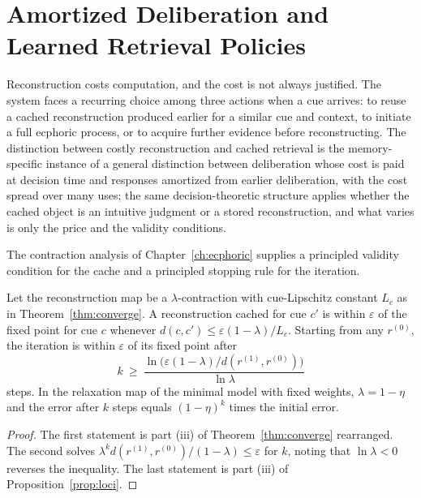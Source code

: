 \chapter{Amortized Deliberation and Learned Retrieval Policies}\label{ch:amortized}

Reconstruction costs computation, and the cost is not always justified. The system faces a recurring choice among three actions when a cue arrives: to reuse a cached reconstruction produced earlier for a similar cue and context, to initiate a full ecphoric process, or to acquire further evidence before reconstructing. The distinction between costly reconstruction and cached retrieval is the memory-specific instance of a general distinction between deliberation whose cost is paid at decision time and responses amortized from earlier deliberation, with the cost spread over many uses; the same decision-theoretic structure applies whether the cached object is an intuitive judgment or a stored reconstruction, and what varies is only the price and the validity conditions.

The contraction analysis of Chapter~\ref{ch:ecphoric} supplies a principled validity condition for the cache and a principled stopping rule for the iteration.

\begin{proposition}\label{prop:cache}
Let the reconstruction map be a $\lambda$-contraction with cue-Lipschitz constant $L_c$ as in Theorem~\ref{thm:converge}. A reconstruction cached for cue $c'$ is within $\varepsilon$ of the fixed point for cue $c$ whenever $d(c,c')\le\varepsilon(1-\lambda)/L_c$. Starting from any $r^{(0)}$, the iteration is within $\varepsilon$ of its fixed point after
\begin{equation}
k\ \ge\ \frac{\ln\bigl(\varepsilon(1-\lambda)/d(r^{(1)},r^{(0)})\bigr)}{\ln\lambda}
\end{equation}
steps. In the relaxation map of the minimal model with fixed weights, $\lambda=1-\eta$ and the error after $k$ steps equals $(1-\eta)^k$ times the initial error.
\end{proposition}

\begin{proof}
The first statement is part (iii) of Theorem~\ref{thm:converge} rearranged. The second solves $\lambda^kd(r^{(1)},r^{(0)})/(1-\lambda)\le\varepsilon$ for $k$, noting that $\ln\lambda<0$ reverses the inequality. The last statement is part (iii) of Proposition~\ref{prop:loci}.
\end{proof}

